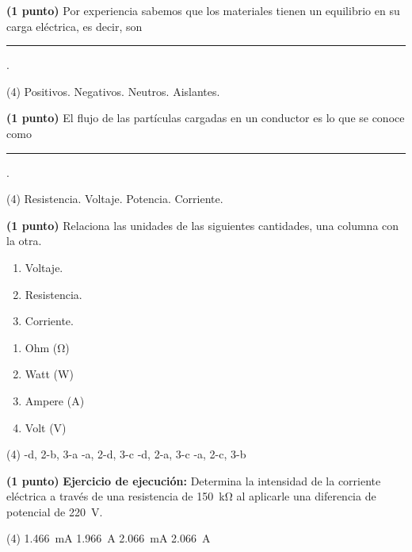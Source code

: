\documentclass[12pt, letter]{exam}
\begin{document}
\begin{questions}
    \question \textbf{(1 punto)} Por experiencia sabemos que los materiales tienen un equilibrio en su carga eléctrica, es decir, son \rule{2cm}{0.1mm}.
    \begin{tasks}(4)
        \task Positivos.
        \task Negativos.
        \task Neutros.
        \task Aislantes.
    \end{tasks}
    \question \textbf{(1 punto)} El flujo de las partículas cargadas en un conductor es lo que se conoce como \rule{2cm}{0.1mm}.
    \begin{tasks}(4)
        \task Resistencia.
        \task Voltaje.
        \task Potencia.
        \task Corriente.
    \end{tasks}
    \question \textbf{(1 punto)} Relaciona las unidades de las siguientes cantidades, una columna con la otra.
    \\
    \begin{minipage}[t]{0.4\linewidth}
        \begin{enumerate}[label=\arabic*)]
            \item Voltaje.
            \item Resistencia.
            \item Corriente.
        \end{enumerate}
    \end{minipage}
    \begin{minipage}[t]{0.4\linewidth}
        \begin{enumerate}[label=\alph*)]
            \item Ohm (\si{\ohm})
            \item Watt (\si{\watt})
            \item Ampere (\si{\ampere})
            \item Volt (\si{\volt})
        \end{enumerate}
    \end{minipage}
    \begin{tasks}(4)
        -d, 2-b, 3-a
        -a, 2-d, 3-c
        -d, 2-a, 3-c
        -a, 2-c, 3-b
    \end{tasks}
    \question \textbf{(1 punto)} \label{Problema_02} \textbf{Ejercicio de ejecución: } Determina la intensidad de la corriente eléctrica a través de una resistencia de \SI{150}{\kilo\ohm} al aplicarle una diferencia de potencial de \SI{220}{\volt}.
    \begin{tasks}(4)
        \task \SI{1.466}{\milli\ampere}
        \task \SI{1.966}{\ampere}
        \task \SI{2.066}{\milli\ampere}
        \task \SI{2.066}{\ampere}
    \end{tasks}


\end{questions}
\end{document}

